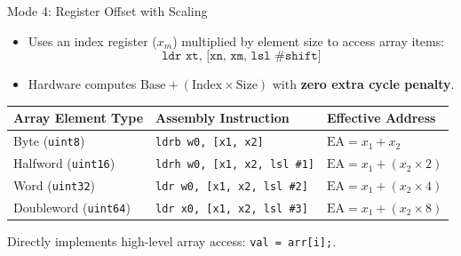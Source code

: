 \documentclass[aspectratio=169,11pt,t]{beamer}
\newcommand{\key}[1]{\textbf{#1}}
\newcommand{\code}[1]{\texttt{#1}}
\begin{document}
\begin{frame}{Mode 4: Register Offset with Scaling}
\large
\begin{itemize}\setlength{\itemsep}{6pt}
  \item Uses an index register ($x_m$) multiplied by element size to access array items:
  $$\code{ldr xt, [xn, xm, lsl \#shift]}$$
  \item Hardware computes $\text{Base} + (\text{Index} \times \text{Size})$ with \key{zero extra cycle penalty}.
\end{itemize}

\vspace{0.2cm}
\begin{center}
\small
\setlength{\tabcolsep}{8pt}
\begin{tabular}{lll}
\toprule
\textbf{Array Element Type} & \textbf{Assembly Instruction} & \textbf{Effective Address} \\
\midrule
Byte (\code{uint8})    & \code{ldrb w0, [x1, x2]}          & $\text{EA} = x_1 + x_2$ \\
Halfword (\code{uint16})& \code{ldrh w0, [x1, x2, lsl \#1]} & $\text{EA} = x_1 + (x_2 \times 2)$ \\
Word (\code{uint32})    & \code{ldr  w0, [x1, x2, lsl \#2]} & $\text{EA} = x_1 + (x_2 \times 4)$ \\
Doubleword (\code{uint64})& \code{ldr  x0, [x1, x2, lsl \#3]} & $\text{EA} = x_1 + (x_2 \times 8)$ \\
\bottomrule
\end{tabular}
\end{center}

\vspace{0.2cm}
\normalsize
Directly implements high-level array access: \code{val = arr[i];}.
\end{frame}

\end{document}
